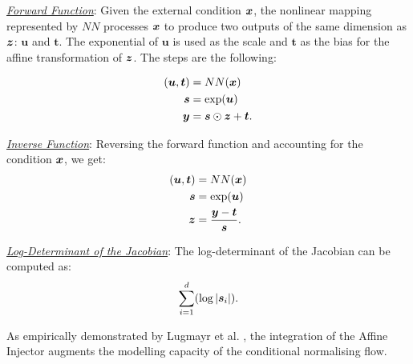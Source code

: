 \smallskip

\textit{\underline{Forward Function}}:
Given the external condition \(\boldsymbol{x}\), the nonlinear mapping represented by \(NN\) processes \(\boldsymbol{x}\) to produce two outputs of the same dimension as \(\boldsymbol{z}\): \(\boldsymbol{u}\) and \(\boldsymbol{t}\). The exponential of \(\boldsymbol{u}\) is used as the scale and \(\boldsymbol{t}\) as the bias for the affine transformation of \(\boldsymbol{z}\). The steps are the following:

\begin{align*}
(\boldsymbol{u}, \boldsymbol{t}) &= NN(\boldsymbol{x}) \\
\boldsymbol{s} &= \exp(\boldsymbol{u}) \\
\boldsymbol{y} &= \boldsymbol{s} \odot \boldsymbol{z} + \boldsymbol{t}.
\end{align*}

\smallskip

\textit{\underline{Inverse Function}}:
Reversing the forward function and accounting for the condition \(\boldsymbol{x}\), we get:
\begin{align*}
(\boldsymbol{u}, \boldsymbol{t}) &= NN(\boldsymbol{x}) \\
\boldsymbol{s} &= \exp(\boldsymbol{u}) \\
\boldsymbol{z} &= \frac{\boldsymbol{y} - \boldsymbol{t}}{\boldsymbol{s}}.
\end{align*}

\smallskip

\textit{\underline{Log-Determinant of the Jacobian}}:
The log-determinant of the Jacobian can be computed as:
\[\sum_{i=1}^{d}(\log |\boldsymbol{s}_i|).\]

As empirically demonstrated by Lugmayr et al. \cite{SRFLOW}, the integration of the Affine Injector augments the modelling capacity of the conditional normalising flow.

